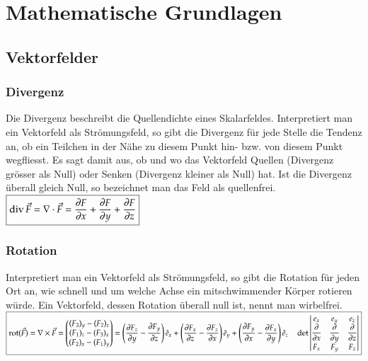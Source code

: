\section{Mathematische Grundlagen}
\subsection{Vektorfelder}
\subsubsection{Divergenz}
	Die Divergenz beschreibt die Quellendichte eines Skalarfeldes. 
	Interpretiert man ein Vektorfeld als Strömungsfeld, so gibt die Divergenz für jede
	Stelle die Tendenz an, ob ein Teilchen in der Nähe zu diesem Punkt hin- bzw.
	von diesem Punkt wegfliesst. Es sagt damit aus, ob und wo das Vektorfeld Quellen
	(Divergenz grösser als Null) oder Senken (Divergenz kleiner als Null) hat. Ist
	die Divergenz überall gleich Null, so bezeichnet man das Feld als quellenfrei.\\
	
	$\boxed{\operatorname{div} \vec{F}=\nabla \cdot \vec{F}= \frac{\partial F}{\partial x}+\frac{\partial F}{\partial y}+\frac{\partial F}{\partial z}}$

\subsubsection{Rotation}
Interpretiert man ein Vektorfeld als Strömungsfeld, so gibt die Rotation für jeden
Ort an, wie schnell und um welche Achse ein mitschwimmender Körper rotieren
würde. Ein Vektorfeld, dessen Rotation überall null ist, nennt man wirbelfrei.\\

$\boxed{\operatorname{rot}(\vec F)=\nabla\times\vec{F} = 
	\begin{pmatrix}
	(F_3)_y - (F_2)_z\\
	(F_1)_z - (F_3)_x\\
	(F_2)_x - (F_1)_y
	\end{pmatrix} = \left({\frac {\partial F_{z}}{\partial y}}-{\frac {\partial F_{y}}{\partial z}}\right){\hat {e}}_{x}+\left({\frac {\partial F_{x}}{\partial z}}-{\frac {\partial F_{z}}{\partial x}}\right){\hat {e}}_{y}+\left({\frac {\partial F_{y}}{\partial x}}-{\frac {\partial F_{x}}{\partial y}}\right){\hat {e}}_{z} \quad 
	\det
	\begin{vmatrix}
	e_x & e_y&e_z\\
	\dfrac{\partial}{\partial x} & \dfrac{\partial}{\partial y}& \dfrac{\partial}{\partial z}\\
	F_x& F_y & F_z
	\end{vmatrix}}$

